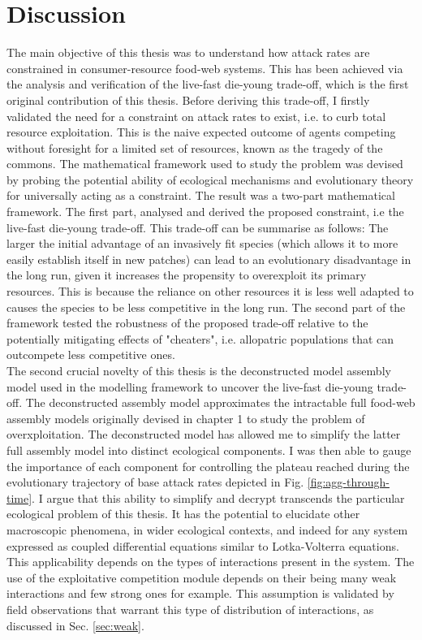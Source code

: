 \documentclass[a4paper]{report}
\begin{document}
\section*{Discussion}

The main objective of this thesis was to understand how attack rates are constrained in consumer-resource food-web systems. This has been achieved via the analysis and verification of the live-fast die-young trade-off, which is the first original contribution of this thesis. Before deriving this trade-off, I firstly validated the need for a constraint on attack rates to exist, i.e. to curb total resource exploitation. This is the naive expected outcome of agents competing without foresight for a limited set of resources, known as the tragedy of the commons. The mathematical framework used to study the problem was devised by probing the potential ability of ecological mechanisms and evolutionary theory for universally acting as a constraint. The result was a two-part mathematical framework. The first part, analysed and derived the proposed constraint, i.e the live-fast die-young trade-off. This trade-off can be summarise as follows: The larger the initial advantage of an invasively fit species (which allows it to more easily establish itself in new patches) can lead to an evolutionary disadvantage in the long run, given it increases the propensity to overexploit its primary resources. This is because the reliance on other resources it is less well adapted to causes the species to be less competitive in the long run. The second part of the framework tested the robustness of the proposed trade-off relative to the potentially mitigating effects of "cheaters", i.e. allopatric populations that can outcompete less competitive ones.\\

 The second crucial novelty of this thesis is the deconstructed model assembly model used in the modelling framework to uncover the live-fast die-young trade-off. The deconstructed assembly model approximates the intractable full food-web assembly models originally devised in chapter 1 to study the problem of overxploitation. The deconstructed model has allowed me to simplify the latter full assembly model into distinct ecological components. I was then able to gauge the importance of each component for controlling the plateau reached during the evolutionary trajectory of base attack rates depicted in Fig. \ref{fig:agg-through-time}. I argue that this ability to simplify and decrypt transcends the particular ecological problem of this thesis. It has the potential to elucidate other macroscopic phenomena, in wider ecological contexts, and indeed for any system expressed as coupled differential equations similar to Lotka-Volterra equations. This applicability depends on the types of interactions present in the system. The use of the exploitative competition module depends on their being many weak interactions and few strong ones for example. This assumption is validated by field observations that warrant this type of distribution of interactions, as discussed in Sec. \ref{sec:weak}.\\
 
\end{document}
